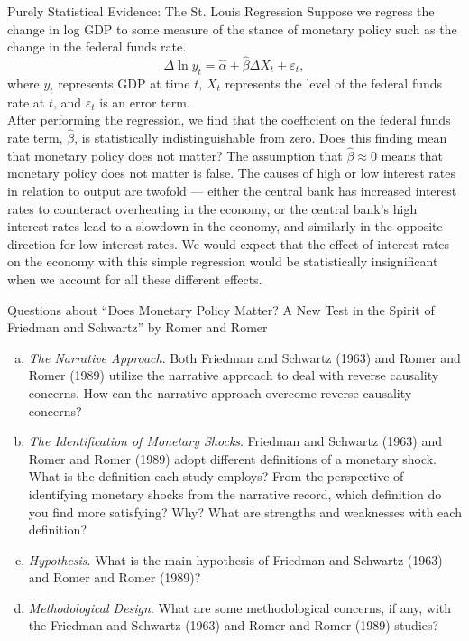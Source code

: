 \documentclass[10pt]{extarticle}
\title{}
\author{Avinash Iyer}
\date{}
\begin{document}
{
  \begin{problem}{Purely Statistical Evidence: The St. Louis Regression}
    Suppose we regress the change in log GDP to some measure of the stance of monetary policy such as the change in the federal funds rate.
    \[
      \Delta \ln y_t= \hat{\alpha} + \hat{\beta}\Delta X_t + \varepsilon_t,
    \]
    where $y_t$ represents GDP at time $t$, $X_t$ represents the level of the federal funds rate at $t$, and $\varepsilon_t$ is an error term.\\

    After performing the regression, we find that the coefficient on the federal funds rate term, $\hat\beta$, is statistically indistinguishable from zero. Does this finding mean that monetary policy does not matter?
    \tcblower
    The assumption that $\hat\beta \approx 0$ means that monetary policy does not matter is false. The causes of high or low interest rates in relation to output are twofold --- either the central bank has increased interest rates to counteract overheating in the economy, or the central bank's high interest rates lead to a slowdown in the economy, and similarly in the opposite direction for low interest rates. We would expect that the effect of interest rates on the economy with this simple regression would be statistically insignificant when we account for all these different effects.
  \end{problem}
  \begin{problem}{Questions about ``Does Monetary Policy Matter? A New Test in the Spirit of Friedman and Schwartz'' by Romer and Romer}
    \begin{enumerate}[(a)]
      \item \textit{The Narrative Approach}. Both Friedman and Schwartz (1963) and Romer and Romer (1989) utilize the narrative approach to deal with reverse causality concerns. How can the narrative approach overcome reverse causality concerns?
      \item \textit{The Identification of Monetary Shocks}. Friedman and Schwartz (1963) and Romer and Romer (1989) adopt different definitions of a monetary shock. What is the definition each study employs? From the perspective of identifying monetary shocks from the narrative record, which definition do you find more satisfying? Why? What are strengths and weaknesses with each definition?
      \item \textit{Hypothesis}. What is the main hypothesis of Friedman and Schwartz (1963) and Romer and Romer (1989)?
      \item \textit{Methodological Design}. What are some methodological concerns, if any, with the Friedman and Schwartz (1963) and Romer and Romer (1989) studies?

\end{enumerate}
\end{problem}}
\end{document}
